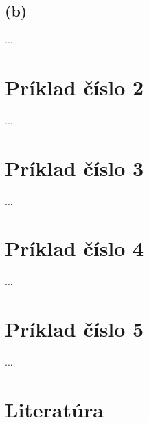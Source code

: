\documentclass[11pt,a4paper]{article}
\begin{document}
\newpage
\subsection{(b)}

...

\newpage
\section{Príklad číslo 2}

...

\newpage
\section{Príklad číslo 3}

...

\newpage
\section{Príklad číslo 4}

...

\newpage
\section{Príklad číslo 5}

...\cite{TIN}

\newpage
\section{Literatúra}

\begin{flushleft}
    
\end{flushleft}
\end{document}
